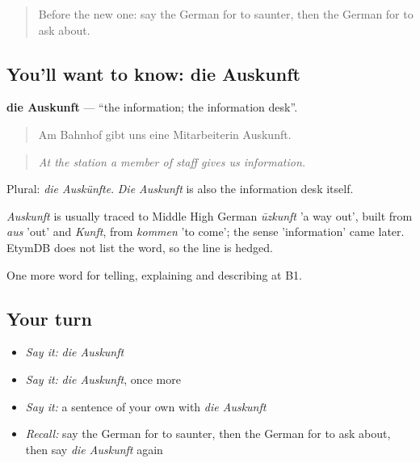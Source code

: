 \label{lesson:GE-C437-auskunft}



\begin{quote}
Before the new one: say the German for to saunter, then the German for to ask about.
\end{quote}

\subsection*{You'll want to know: die Auskunft}
\textbf{die Auskunft} — \textquotedblleft{}the information; the information desk\textquotedblright{}.

\begin{quote}
Am Bahnhof gibt uns eine Mitarbeiterin Auskunft.
\end{quote}

\begin{quote}
\emph{At the station a member of staff gives us information.}
\end{quote}

Plural: \emph{die Auskünfte}. \emph{Die Auskunft} is also the information desk itself.

\begin{cousinweb}
\emph{Auskunft} is usually traced to Middle High German \emph{ūzkunft} 'a way out', built from \emph{aus} 'out' and \emph{Kunft}, from \emph{kommen} 'to come'; the sense 'information' came later. EtymDB does not list the word, so the line is hedged.
\end{cousinweb}

\begin{grammarlens}[title={What you've built}]
One more word for telling, explaining and describing at B1.
\end{grammarlens}

\subsection*{Your turn}
\begin{itemize}
\raggedright
  \item \emph{Say it:} \emph{die Auskunft}
  \item \emph{Say it:} \emph{die Auskunft}, once more
  \item \emph{Say it:} a sentence of your own with \emph{die Auskunft}
  \item \emph{Recall:} say the German for to saunter, then the German for to ask about, then say \emph{die Auskunft} again
\end{itemize}

